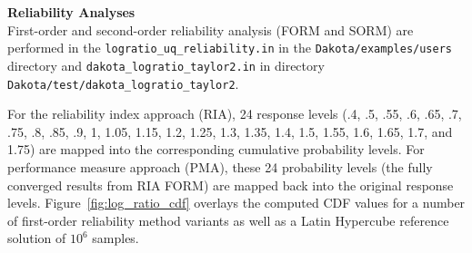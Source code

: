 {\bf Reliability Analyses} \\

First-order and second-order reliability analysis (FORM and SORM) are performed in the
\texttt{logratio\_uq\_reliability.in} in the {\tt Dakota/examples/users}
 directory and \texttt{dakota\_logratio\_taylor2.in} in directory 
{\tt Dakota/test/dakota\_logratio\_taylor2}. 

For the reliability index approach (RIA),
24 response levels (.4, .5, .55,
.6, .65, .7, .75, .8, .85, .9, 1, 1.05, 1.15, 1.2, 1.25, 1.3, 1.35,
1.4, 1.5, 1.55, 1.6, 1.65, 1.7, and 1.75) are mapped into the
corresponding cumulative probability levels. For performance measure approach (PMA), these 24
probability levels (the fully converged results from RIA FORM) are
mapped back into the original response levels.
Figure~\ref{fig:log_ratio_cdf} overlays the computed CDF values for a
number of first-order reliability method variants as well as a Latin
Hypercube reference solution of $10^6$ samples.
